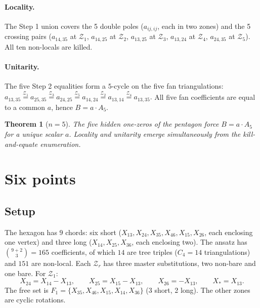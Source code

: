 \documentclass[11pt]{article}
\newtheorem{theorem}{Theorem}
\newcommand{\Zr}{\mathcal{Z}}
\newcommand{\Fr}{F}
\begin{document}
\paragraph{Locality.}
The Step 1 union covers the 5 double poles ($a_{ij,ij}$, each in
two zones) and the 5 crossing pairs ($a_{14,35}$ at $\Zr_1$,
$a_{14,25}$ at $\Zr_2$, $a_{13,25}$ at $\Zr_3$, $a_{13,24}$ at
$\Zr_4$, $a_{24,35}$ at $\Zr_5$).  All ten non-locals are killed.

\paragraph{Unitarity.}
The five Step 2 equalities form a $5$-cycle on the five fan triangulations:
\(
a_{13,35} \overset{\Zr_1}{=} a_{25,35}
          \overset{\Zr_3}{=} a_{24,25}
          \overset{\Zr_5}{=} a_{14,24}
          \overset{\Zr_2}{=} a_{13,14}
          \overset{\Zr_4}{=} a_{13,35}.
\)
All five fan coefficients are equal to a common $a$, hence
$B = a\cdot A_5$.

\begin{theorem}[$n=5$]\label{thm:n5}
The five hidden one-zeros of the pentagon force $B = a\cdot A_5$
for a unique scalar $a$.  Locality and unitarity emerge
simultaneously from the kill-and-equate enumeration.
\end{theorem}

\section{Six points}

\subsection{Setup}

The hexagon has $9$ chords: six short ($X_{13},X_{24},X_{35},X_{46},X_{15},X_{26}$,
each enclosing one vertex) and three long ($X_{14},X_{25},X_{36}$,
each enclosing two).  The ansatz has $\binom{9+2}{3}=165$
coefficients, of which $14$ are tree triples ($C_4=14$
triangulations) and $151$ are non-local.  Each $\Zr_r$ has three
master substitutions, two non-bare and one bare.  For $\Zr_1$:
\[
X_{24}=X_{14}-X_{13},\qquad X_{25}=X_{15}-X_{13},\qquad X_{26}=-X_{13},
\qquad X_*=X_{13}.
\]
The free set is
$\Fr_1 = \{X_{35},X_{46},X_{15},X_{14},X_{36}\}$ (3 short, 2 long).
The other zones are cyclic rotations.
\end{document}
